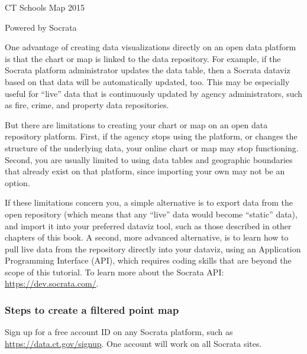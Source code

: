\documentclass[
  english,
]{book}
\begin{document}
CT Schools Map 2015

Powered by Socrata

One advantage of creating data visualizations directly on an open data platform is that the chart or map is linked to the data repository. For example, if the Socrata platform administrator updates the data table, then a Socrata dataviz based on that data will be automatically updated, too. This may be especially useful for ``live'' data that is continuously updated by agency administrators, such as fire, crime, and property data repositories.

But there are limitations to creating your chart or map on an open data repository platform. First, if the agency stops using the platform, or changes the structure of the underlying data, your online chart or map may stop functioning. Second, you are usually limited to using data tables and geographic boundaries that already exist on that platform, since importing your own may not be an option.

If these limitations concern you, a simple alternative is to export data from the open repository (which means that any ``live'' data would become ``static'' data), and import it into your preferred dataviz tool, such as those described in other chapters of this book. A second, more advanced alternative, is to learn how to pull live data from the repository directly into your dataviz, using an Application Programming Interface (API), which requires coding skills that are beyond the scope of this tutorial. To learn more about the Socrata API: \url{https://dev.socrata.com/}.

\hypertarget{steps-to-create-a-filtered-point-map}{%
\subsubsection*{Steps to create a filtered point map}\label{steps-to-create-a-filtered-point-map}}

Sign up for a free account ID on any Socrata platform, such as \url{https://data.ct.gov/signup}. One account will work on all Socrata sites.
\end{document}
